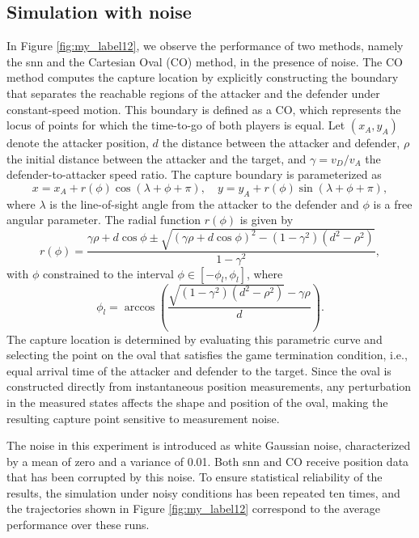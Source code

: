 \subsection{Simulation with noise}

In Figure \ref{fig:my_label12}, we observe the performance of two methods, namely the \ac{snn} and the Cartesian Oval (CO) method, in the presence of noise. The CO method computes the capture location by explicitly constructing the boundary that separates the reachable regions of the attacker and the defender under constant-speed motion. This boundary is defined as a CO, which represents the locus of points for which the time-to-go of both players is equal. Let $(x_A,y_A)$ denote the attacker position, $d$ the distance between the attacker and defender, $\rho$ the initial distance between the attacker and the target, and $\gamma = v_D / v_A$ the defender-to-attacker speed ratio. The capture boundary is parameterized as
\begin{equation}
x = x_A + r(\phi)\cos(\lambda + \phi + \pi), \quad
y = y_A + r(\phi)\sin(\lambda + \phi + \pi),
\end{equation}
where $\lambda$ is the line-of-sight angle from the attacker to the defender and $\phi$ is a free angular parameter. The radial function $r(\phi)$ is given by
\begin{equation}
r(\phi) =
\frac{\gamma \rho + d \cos\phi \pm
\sqrt{(\gamma \rho + d \cos\phi)^2 - (1-\gamma^2)(d^2 - \rho^2)}}
{1-\gamma^2},
\end{equation}
with $\phi$ constrained to the interval $\phi \in [-\phi_l,\phi_l]$, where
\begin{equation}
\phi_l =
\arccos\!\left(
\frac{\sqrt{(1-\gamma^2)(d^2-\rho^2)} - \gamma \rho}{d}
\right).
\end{equation}
The capture location is determined by evaluating this parametric curve and selecting the point on the oval that satisfies the game termination condition, i.e., equal arrival time of the attacker and defender to the target. Since the oval is constructed directly from instantaneous position measurements, any perturbation in the measured states affects the shape and position of the oval, making the resulting capture point sensitive to measurement noise.

The noise in this experiment is introduced as white Gaussian noise, characterized by a mean of zero and a variance of 0.01. Both \ac{snn} and CO receive position data that has been corrupted by this noise. To ensure statistical reliability of the results, the simulation under noisy conditions has been repeated ten times, and the trajectories shown in Figure \ref{fig:my_label12} correspond to the average performance over these runs.

